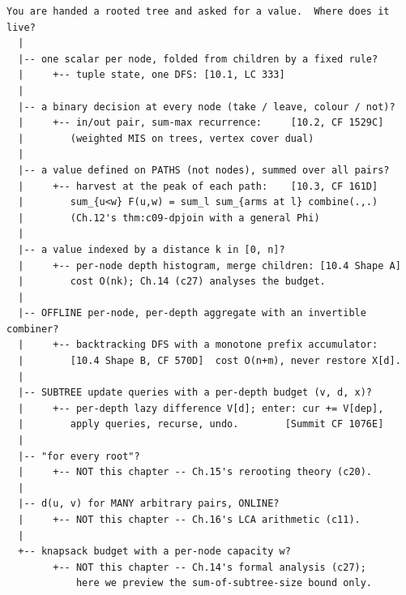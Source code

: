 \begin{lstlisting}[language={}, basicstyle=\ttfamily\small, numbers=none, frame=single]
  You are handed a rooted tree and asked for a value.  Where does it live?
  |
  |-- one scalar per node, folded from children by a fixed rule?
  |     +-- tuple state, one DFS: [10.1, LC 333]
  |
  |-- a binary decision at every node (take / leave, colour / not)?
  |     +-- in/out pair, sum-max recurrence:     [10.2, CF 1529C]
  |        (weighted MIS on trees, vertex cover dual)
  |
  |-- a value defined on PATHS (not nodes), summed over all pairs?
  |     +-- harvest at the peak of each path:    [10.3, CF 161D]
  |        sum_{u<w} F(u,w) = sum_l sum_{arms at l} combine(.,.)
  |        (Ch.12's thm:c09-dpjoin with a general Phi)
  |
  |-- a value indexed by a distance k in [0, n]?
  |     +-- per-node depth histogram, merge children: [10.4 Shape A]
  |        cost O(nk); Ch.14 (c27) analyses the budget.
  |
  |-- OFFLINE per-node, per-depth aggregate with an invertible combiner?
  |     +-- backtracking DFS with a monotone prefix accumulator:
  |        [10.4 Shape B, CF 570D]  cost O(n+m), never restore X[d].
  |
  |-- SUBTREE update queries with a per-depth budget (v, d, x)?
  |     +-- per-depth lazy difference V[d]; enter: cur += V[dep],
  |        apply queries, recurse, undo.        [Summit CF 1076E]
  |
  |-- "for every root"?
  |     +-- NOT this chapter -- Ch.15's rerooting theory (c20).
  |
  |-- d(u, v) for MANY arbitrary pairs, ONLINE?
  |     +-- NOT this chapter -- Ch.16's LCA arithmetic (c11).
  |
  +-- knapsack budget with a per-node capacity w?
        +-- NOT this chapter -- Ch.14's formal analysis (c27);
            here we preview the sum-of-subtree-size bound only.
\end{lstlisting}


